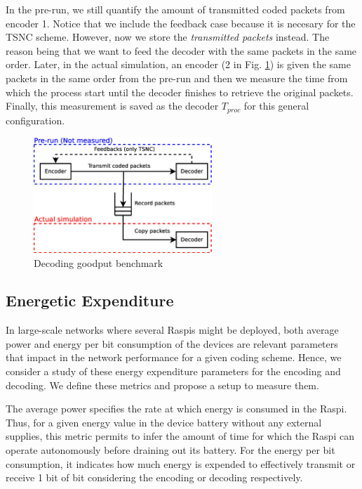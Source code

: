 In the pre-run, we still quantify the amount of transmitted coded
packets from encoder 1. Notice that we include the feedback case because
it is necesary for the \ac{TSNC} scheme. However, now we store
the \textit{transmitted packets} instead. The reason being
that we want to feed the decoder with the same packets in the same
order. Later, in the actual simulation, an encoder (2 in Fig.
\ref{fig:dec_goodput_benchmark}) is given the same packets in the same
order from the pre-run and then we measure the time from which the
process start until the decoder finishes to retrieve the original
packets. Finally, this measurement is saved as the decoder $T_{proc}$
for this general configuration.

\begin{figure}[ht!]
\centering
\includegraphics[width=0.6\textwidth]{images/measure_decoder.eps}
\caption{Decoding goodput benchmark}
\label{fig:dec_goodput_benchmark}
\end{figure}

\subsection{Energetic Expenditure}
In large-scale networks where several \ac{Raspi}s might be deployed,
both average power and energy per bit consumption of the devices are
relevant parameters that impact in the network performance for a given
coding scheme. Hence, we consider a study of these energy expenditure
parameters for the encoding and decoding. We define these metrics
and propose a setup to measure them.

The average power specifies the rate at which energy is
consumed in the \ac{Raspi}. Thus, for a given energy value in the device
battery without any external supplies, this metric permits to infer the amount
of time for which the \ac{Raspi} can operate autonomously before draining
out its battery. For the energy per bit consumption, it indicates how
much energy is expended to effectively transmit or receive 1 bit of bit
considering the encoding or decoding respectively.

